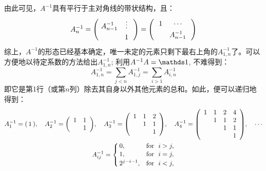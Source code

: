 \documentclass[preview,10pt,border=8pt]{standalone}
\begin{document}
	由此可见，$A^{-1}$具有平行于主对角线的带状结构，且：
	\begin{equation}
		A^{-1}_n = \pqty\Bigg{\ 
		 	\begin{matrix}
				A^{-1}_{n-1} & \vdots \\[.8ex]
				& 1
		 	\end{matrix}\ \ }
	 	= \pqty\Bigg{\ \ 
 		 	\begin{matrix}
 				1 & \cdots \\[.8ex]
 				& A^{-1}_{n-1}
 		 	\end{matrix}\ \ }
	\end{equation}
	综上，$A^{-1}$的形态已经基本确定，唯一未定的元素只剩下最右上角的$A^{-1}_{1,n}$了。可以方便地以待定系数的方法给出$A^{-1}_{1,n}$; 利用$A^{-1}A = \idty$, 不难得到：
	\begin{equation}
		A^{-1}_{1,n}
		= \sum_{j<n} A^{-1}_{1,j}
		= \sum_{i>1} A^{-1}_{i,n}
	\end{equation}
	即它是第1行（或第$n$列）除去其自身以外其他元素的总和。如此，便可以递归地得到：
	\begin{equation}
	\begin{gathered}
		A^{-1}_1 = (\,1\,),\quad
		A^{-1}_2 = \pqty{
			\begin{array}{cc}
				1 & 1 \\
				  & 1
			\end{array}
		},\quad
		A^{-1}_3 = \pqty{
			\begin{array}{ccc}
				1 & 1 & 2 \\
				  & 1 & 1 \\
				  &   & 1
			\end{array}
		},\quad
		A^{-1}_4 = \pqty{
			\begin{array}{cccc}
				1 & 1 & 2 & 4 \\
				  & 1 & 1 & 2 \\
				  &   & 1 & 1 \\
				  &   &   & 1 \\
			\end{array}
		},\quad\cdots\\
		A^{-1}_{ij} = \left\lbrace
		\begin{aligned}\,
			& 0, \,
			&&\text{for}\ \ i > j, \\[-.5ex]
			& 1, \,
			&&\text{for}\ \ i = j, \\[-.5ex]
			& 2^{j-i-1}, 
			&&\text{for}\ \ i < j,
		\end{aligned}\right.
	\end{gathered}
	\end{equation}
\end{document}
